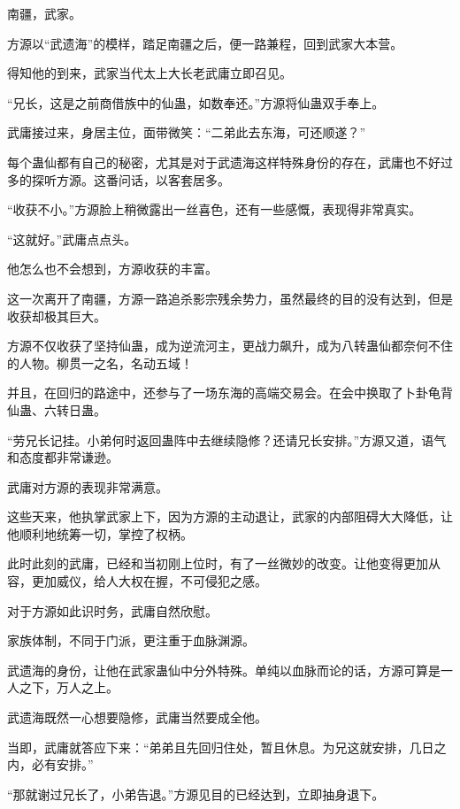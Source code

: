 
\begin{this_body}



南疆，武家。

方源以“武遗海”的模样，踏足南疆之后，便一路兼程，回到武家大本营。

得知他的到来，武家当代太上大长老武庸立即召见。

“兄长，这是之前商借族中的仙蛊，如数奉还。”方源将仙蛊双手奉上。

武庸接过来，身居主位，面带微笑：“二弟此去东海，可还顺遂？”

每个蛊仙都有自己的秘密，尤其是对于武遗海这样特殊身份的存在，武庸也不好过多的探听方源。这番问话，以客套居多。

“收获不小。”方源脸上稍微露出一丝喜色，还有一些感慨，表现得非常真实。

“这就好。”武庸点点头。

他怎么也不会想到，方源收获的丰富。

这一次离开了南疆，方源一路追杀影宗残余势力，虽然最终的目的没有达到，但是收获却极其巨大。

方源不仅收获了坚持仙蛊，成为逆流河主，更战力飙升，成为八转蛊仙都奈何不住的人物。柳贯一之名，名动五域！

并且，在回归的路途中，还参与了一场东海的高端交易会。在会中换取了卜卦龟背仙蛊、六转日蛊。

“劳兄长记挂。小弟何时返回蛊阵中去继续隐修？还请兄长安排。”方源又道，语气和态度都非常谦逊。

武庸对方源的表现非常满意。

这些天来，他执掌武家上下，因为方源的主动退让，武家的内部阻碍大大降低，让他顺利地统筹一切，掌控了权柄。

此时此刻的武庸，已经和当初刚上位时，有了一丝微妙的改变。让他变得更加从容，更加威仪，给人大权在握，不可侵犯之感。

对于方源如此识时务，武庸自然欣慰。

家族体制，不同于门派，更注重于血脉渊源。

武遗海的身份，让他在武家蛊仙中分外特殊。单纯以血脉而论的话，方源可算是一人之下，万人之上。

武遗海既然一心想要隐修，武庸当然要成全他。

当即，武庸就答应下来：“弟弟且先回归住处，暂且休息。为兄这就安排，几日之内，必有安排。”

“那就谢过兄长了，小弟告退。”方源见目的已经达到，立即抽身退下。


\end{this_body}
